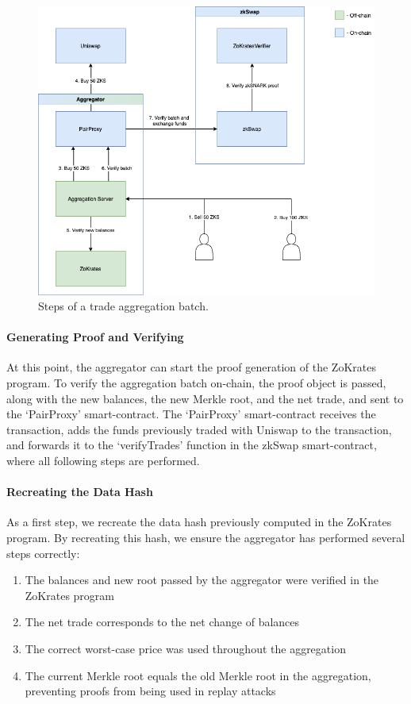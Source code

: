 \documentclass[../../thesis.tex]{subfiles}
\begin{document}
\begin{figure}[h]
    \centerline{\includegraphics[totalheight=10cm]{diagrams/tradeAggrFlow.png}}
    \caption{Steps of a trade aggregation batch.}
    \label{fig:zokrates}
\end{figure}

\paragraph{Generating Proof and Verifying}
At this point, the aggregator can start the proof generation of the ZoKrates program. To verify the aggregation batch on-chain, the proof object is passed, along with the new balances, the new Merkle root, and the net trade, and sent to the `PairProxy' smart-contract. The `PairProxy' smart-contract receives the transaction, adds the funds previously traded with Uniswap to the transaction, and forwards it to the `verifyTrades' function in the zkSwap smart-contract, where all following steps are performed. 

\paragraph{Recreating the Data Hash}
As a first step, we recreate the data hash previously computed in the ZoKrates program. By recreating this hash, we ensure the aggregator has performed several steps correctly:

\begin{enumerate}
    \item The balances and new root passed by the aggregator were verified in the ZoKrates program
    \item The net trade corresponds to the net change of balances
    \item The correct worst-case price was used throughout the aggregation
    \item The current Merkle root equals the old Merkle root in the aggregation, preventing proofs from being used in replay attacks
\end{enumerate}
\end{document}
